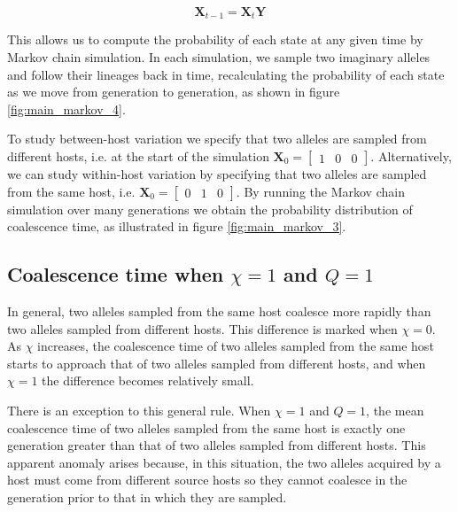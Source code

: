 \documentclass[_main.tex]{subfiles}
\begin{document}
 \begin{equation*} 
\textbf{X}_{t-1} =
\textbf{X}_{t} \textbf{Y}
\label{eq:supp_markov}
\end{equation*}

This allows us to compute the probability of each state at any given time by Markov chain simulation.  In each simulation, we sample two imaginary alleles and follow their lineages back in time, recalculating the probability of each state as we move from generation to generation, as shown in figure \ref{fig:main_markov_4}.

To study between-host variation we specify that two alleles are sampled from different hosts, i.e. at the start of the simulation $\textbf{X}_0 = \begin{bmatrix} 1 & 0 & 0 \end{bmatrix}$.  Alternatively, we can study within-host variation by specifying that two alleles are sampled from the same host, i.e. $\textbf{X}_0 = \begin{bmatrix} 0 & 1 & 0 \end{bmatrix}$.   By running the Markov chain simulation over many generations we obtain the probability distribution of coalescence time, as illustrated in figure \ref{fig:main_markov_3}.   


\subsection{Coalescence time when \texorpdfstring{$\chi =1$ and $Q =1$}{chi=1 and Q=1}}
\label{supp_anomaly}

In general, two alleles sampled from the same host coalesce more rapidly than two alleles sampled from different hosts.   This difference is marked when $\chi=0$.  As $\chi$ increases, the coalescence time of two alleles sampled from the same host starts to approach that of two alleles sampled from different hosts, and when $\chi=1$ the difference becomes relatively small.  

There is an exception to this general rule.  When $\chi=1$ and $Q=1$, the mean coalescence time of two alleles sampled from the same host is exactly one generation greater than that of two alleles sampled from different hosts.  This apparent anomaly arises because, in this situation, the two alleles acquired by a host must come from different source hosts so they cannot coalesce in the generation prior to that in which they are sampled.

\end{document}
